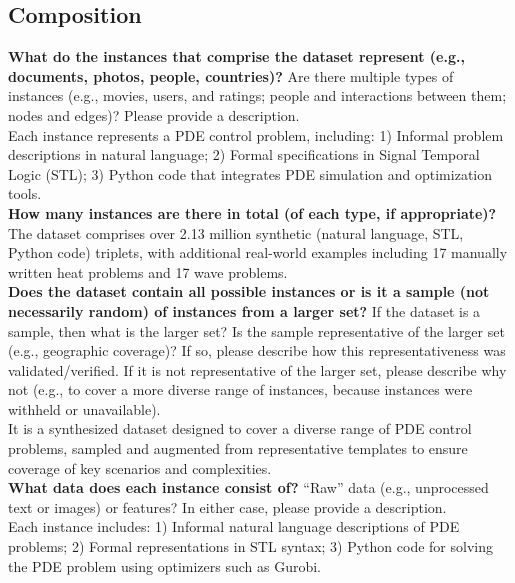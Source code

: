 \subsection{Composition}
    \textcolor{\sectioncolor}{\textbf{What do the instances that comprise the dataset represent (e.g., documents,
    photos, people, countries)?
    }
    Are there multiple types of instances (e.g., movies, users, and ratings;
    people and interactions between them; nodes and edges)? Please provide a
    description.
    } \\
    Each instance represents a PDE control problem, including:
1) Informal problem descriptions in natural language;
2) Formal specifications in Signal Temporal Logic (STL);
3) Python code that integrates PDE simulation and optimization tools. \\
    
    \textcolor{\sectioncolor}{\textbf{How many instances are there in total (of each type, if appropriate)?
    }
    } \\
    The dataset comprises over 2.13 million synthetic (natural language, STL, Python code) triplets, with additional real-world examples including 17 manually written heat problems and 17 wave problems.
    \\
    
    \textcolor{\sectioncolor}{\textbf{Does the dataset contain all possible instances or is it a sample (not
    necessarily random) of instances from a larger set?
    }
    If the dataset is a sample, then what is the larger set? Is the sample
    representative of the larger set (e.g., geographic coverage)? If so, please
    describe how this representativeness was validated/verified. If it is not
    representative of the larger set, please describe why not (e.g., to cover a
    more diverse range of instances, because instances were withheld or
    unavailable).
    } \\
    It is a synthesized dataset designed to cover a diverse range of PDE control problems, sampled and augmented from representative templates to ensure coverage of key scenarios and complexities. \\
    
    \textcolor{\sectioncolor}{\textbf{What data does each instance consist of?
    }
    “Raw” data (e.g., unprocessed text or images) or features? In either case,
    please provide a description.
    } \\
    Each instance includes:
1) Informal natural language descriptions of PDE problems;
2) Formal representations in STL syntax;
3) Python code for solving the PDE problem using optimizers such as Gurobi.
    
